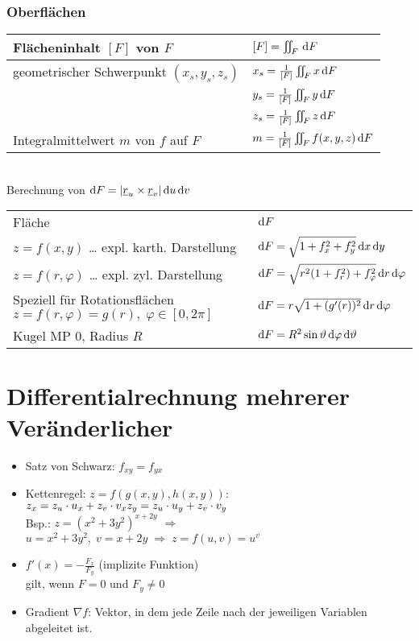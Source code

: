 \subsection{Oberflächen}
\begin{tabular}{L{0.5} | L{0.4}}
Flächeninhalt $[F]$ von $F$ & $[F]=\iint_F \,\mathrm{d}F$\\
\hline
geometrischer Schwerpunkt $(x_s,y_s,z_s)$ & $x_s = \frac{1}{[F]}\iint_F x \,\mathrm{d}F$\\&$y_s = \frac{1}{[F]}\iint_F y \,\mathrm{d}F$\\&$z_s=\frac{1}{[F]}\iint_F z \,\mathrm{d}F$\\
\hline
Integralmittelwert $m$ von $f$ auf $F$ & $m=\frac{1}{[F]}\iint_F f(x,y,z) \,\mathrm{d}F$
\end{tabular}\\
Berechnung von $\mathrm{d}F=|\underline{r}_u\times \underline{r}_v| \,\mathrm{d}u\,\mathrm{d}v$\\
\begin{tabular}{L{0.5} | L{0.4}}
Fläche & $\mathrm{d}F$\\
$z=f(x,y)$ … expl. karth. Darstellung & $\mathrm{d}F=\sqrt{1+f_x^2+f_y^2}\,\mathrm{d}x\,\mathrm{d}y$\\
$z=f(r,\varphi)$ … expl. zyl. Darstellung & $\mathrm{d}F=\sqrt{r^2(1+f_r^2)+f_\varphi^2}\,\mathrm{d}r\,\mathrm{d}\varphi$\\
Speziell für Rotationsflächen $z=f(r,\varphi)=g(r), \; \varphi \in [0,2\pi]$ & $\mathrm{d}F=r\sqrt{1+(g'(r))^2}\,\mathrm{d}r\,\mathrm{d}\varphi$\\
Kugel MP $0$, Radius $R$ & $\mathrm{d}F=R^2\sin \vartheta \,\mathrm{d}\varphi\,\mathrm{d}\vartheta$
\end{tabular}

\chapter{Differentialrechnung mehrerer Veränderlicher}
\begin{itemize}
\item Satz von Schwarz: $f_{xy}=f_{yx}$
\item Kettenregel: $z=f(g(x,y), h(x,y))$:\\
$z_x=z_u\cdot u_x + z_v \cdot v_x\\
z_y=z_u \cdot u_y + z_v \cdot v_y$\\
Bsp.: $z=(x^2+3y^2)^{x+2y}$ $\Rightarrow$ $u=x^2+3y^2, \; v=x+2y \;\Rightarrow\; z=f(u,v)=u^v$
\item $f'(x)=-\frac{F_x}{F_y}$ (implizite Funktion)\\
gilt, wenn $F=0$ und $F_y\not = 0$
\item Gradient $\nabla f$: Vektor, in dem jede Zeile nach der jeweiligen Variablen abgeleitet ist.
\end{itemize}

